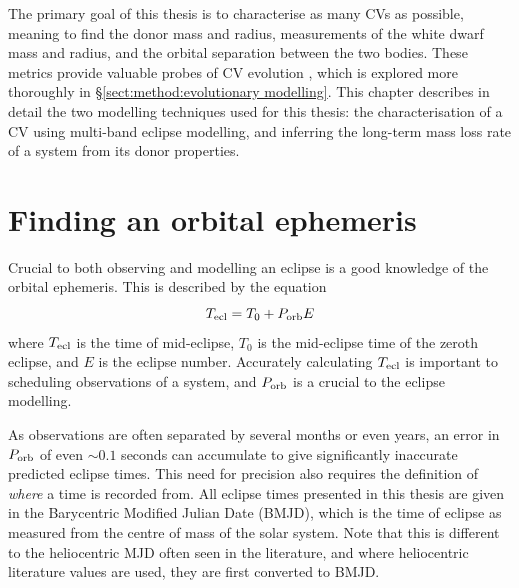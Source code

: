 \label{chpt:modelling and techniques} %



The primary goal of this thesis is to characterise as many CVs as possible, meaning to find the donor mass and radius, measurements of the white dwarf mass and radius, and the orbital separation between the two bodies. These metrics provide valuable probes of CV evolution \citep{knigge2006}, which is explored more thoroughly in \S\ref{sect:method:evolutionary modelling}. 
This chapter describes in detail the two modelling techniques used for this thesis: the characterisation of a CV using multi-band eclipse modelling, and inferring the long-term mass loss rate of a system from its donor properties.


\section{Finding an orbital ephemeris}
\label{sect:modelling:getting ephemeris}

Crucial to both observing and modelling an eclipse is a good knowledge of the orbital ephemeris. This is described by the equation
\begin{equation}
    \label{eqn:modelling:general ephemeris equation}
    T_{\rm ecl} = T_0 + P_{\rm orb} E
\end{equation}
where $T_{\rm ecl}$ is the time of mid-eclipse, $T_0$ is the mid-eclipse time of the zeroth eclipse, and $E$ is the eclipse number. Accurately calculating $T_{\rm ecl}$ is important to scheduling observations of a system, and $P_{\rm orb}$ is a crucial to the eclipse modelling. 

As observations are often separated by several months or even years, an error in $P_{\rm orb}$ of even $\sim 0.1$ seconds can accumulate to give significantly inaccurate predicted eclipse times. This need for precision also requires the definition of {\it where} a time is recorded from. All eclipse times presented in this thesis are given in the Barycentric Modified Julian Date (BMJD), which is the time of eclipse as measured from the centre of mass of the solar system. Note that this is different to the heliocentric MJD often seen in the literature, and where heliocentric literature values are used, they are first converted to BMJD. 

